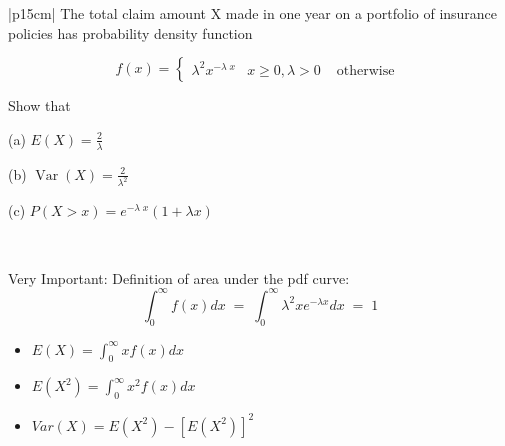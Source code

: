 \documentclass[a4paper,12pt]{article}
\begin{document}
\begin{table}[ht!]
     \centering
     \begin{tabular}{|p{15cm}|}
     \hline        
The total claim amount X made in one year on a portfolio of insurance policies has probability density function 
 
\[ f(x) = \begin{cases} \lambda^2 x^{-\lambda\;x} &x \geq0, \lambda >0  & \mbox{ otherwise } \end{cases} \]

 
Show that 
 
(a) $E(X)  = \frac{2}{\lambda}$
 
(b) $\operatorname{Var}(X)  = \frac{2}{\lambda^2}$
 
(c) $P(X > x) = e^{-\lambda\;x}(1 + \lambda x) $

\\ \hline
\end{tabular}
\end{table}
    

\begin{framed}
  Very Important: Definition of area under the pdf curve:
\[\int^\infty_0 f(x) dx \;=\; \int^\infty_0 \lambda^2 xe^{-\lambda x}dx \;=\; 1\]

\begin{itemize}
\item $E(X) = \int^\infty_0 x f(x) dx $
\item $ E(X^2) = \int^\infty_0 x^2 f(x) dx $  
\item $Var(X) = E(X^2) - [ E(X^2) ]^2$
\end{itemize}
\end{framed}
\end{document}
